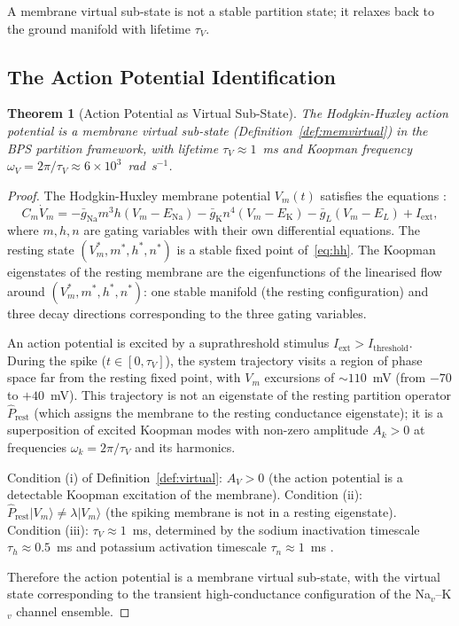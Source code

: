 \documentclass[11pt,twocolumn,a4paper]{article}
\newtheorem{theorem}{Theorem}[section]
\theoremstyle{definition}
\theoremstyle{remark}
\begin{document}
A membrane virtual sub-state is not a stable partition state; it relaxes back
to the ground manifold with lifetime $\tau_V$.

\subsection{The Action Potential Identification}

\begin{theorem}[Action Potential as Virtual Sub-State]
\label{thm:actionpot}
The Hodgkin-Huxley action potential \citep{hodgkin1952} is a membrane virtual
sub-state (Definition~\ref{def:memvirtual}) in the BPS partition framework,
with lifetime $\tau_V \approx 1$~ms and Koopman frequency
$\omega_V = 2\pi / \tau_V \approx 6 \times 10^3$~rad~s$^{-1}$.
\end{theorem}

\begin{proof}
The Hodgkin-Huxley membrane potential $V_m(t)$ satisfies the equations
\citep{hodgkin1952}:
\begin{equation}
C_m \dot{V}_m = -\bar{g}_{\mathrm{Na}} m^3 h (V_m - E_{\mathrm{Na}})
- \bar{g}_{\mathrm{K}} n^4 (V_m - E_{\mathrm{K}}) - \bar{g}_L (V_m - E_L) + I_{\mathrm{ext}},
\label{eq:hh}
\end{equation}
where $m, h, n$ are gating variables with their own differential equations.
The resting state $(V_m^*, m^*, h^*, n^*)$ is a stable fixed point of~\eqref{eq:hh}.
The Koopman eigenstates of the resting membrane are the eigenfunctions of the
linearised flow around $(V_m^*, m^*, h^*, n^*)$: one stable manifold (the
resting configuration) and three decay directions corresponding to the
three gating variables.

An action potential is excited by a suprathreshold stimulus $I_{\mathrm{ext}} > I_{\mathrm{threshold}}$.
During the spike ($t \in [0, \tau_V]$), the system trajectory visits a region
of phase space far from the resting fixed point, with $V_m$ excursions of
$\sim 110$~mV (from $-70$ to $+40$~mV). This trajectory is not an eigenstate
of the resting partition operator $\hat{P}_{\mathrm{rest}}$ (which assigns the
membrane to the resting conductance eigenstate); it is a superposition of
excited Koopman modes with non-zero amplitude $A_k > 0$ at frequencies
$\omega_k = 2\pi/\tau_V$ and its harmonics.

Condition (i) of Definition~\ref{def:virtual}: $A_V > 0$ (the action potential
is a detectable Koopman excitation of the membrane).
Condition (ii): $\hat{P}_{\mathrm{rest}} |V_m\rangle \neq \lambda |V_m\rangle$
(the spiking membrane is not in a resting eigenstate).
Condition (iii): $\tau_V \approx 1$~ms, determined by the sodium inactivation
timescale $\tau_h \approx 0.5$~ms and potassium activation timescale
$\tau_n \approx 1$~ms \citep{hodgkin1952}.

Therefore the action potential is a membrane virtual sub-state, with the
virtual state corresponding to the transient high-conductance configuration
of the Na$_v$--K$_v$ channel ensemble.
\end{proof}
\end{document}
